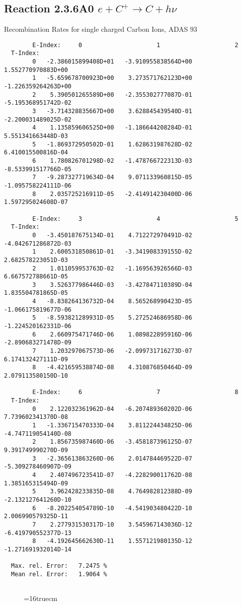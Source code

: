 \documentclass[12pt]{article}
\begin{document}
\subsection{
Reaction 2.3.6A0  $e + C^{+} \rightarrow C + h\nu$
}
 Recombination Rates for single
 charged Carbon Ions, ADAS 93

\begin{small}\begin{verbatim}
        E-Index:     0                     1                     2
  T-Index:
        0   -2.386015899408D+01   -3.910955838564D+00    1.552770970883D+00
        1   -5.659678700923D+00    3.273571762123D+00   -1.226359264263D+00
        2    5.390501265589D+00   -2.355302777087D-01   -5.195368951742D-02
        3   -3.714328835667D+00    3.628845439540D-01   -2.200031489025D-02
        4    1.135859606525D+00   -1.186644208284D-01    5.551341663448D-03
        5   -1.869372950502D-01    1.628631987628D-02    6.410015500816D-04
        6    1.780826701298D-02   -1.478766722313D-03   -8.533991517766D-05
        7   -9.287327719634D-04    9.071133960815D-05   -1.095758224111D-06
        8    2.035725216911D-05   -2.414914230400D-06    1.597295024608D-07

        E-Index:     3                     4                     5
  T-Index:
        0   -3.450187675134D-01    4.712272970491D-02   -4.042671286872D-03
        1    2.600531850861D-01   -3.341908339155D-02    2.682578223051D-03
        2    1.011059953763D-02   -1.169563926566D-03    6.667572788661D-05
        3    3.526377986446D-03   -3.427847110389D-04    1.835504781865D-05
        4   -8.838264136732D-04    8.565268990423D-05   -1.066175819677D-06
        5   -8.593821289931D-05    5.272524686958D-06   -1.224520162331D-06
        6    2.660975471746D-06    1.089822895916D-06   -2.890683271478D-09
        7    1.203297067573D-06   -2.099731716273D-07    6.174132427111D-09
        8   -4.421659538874D-08    4.310876850464D-09    2.079113580150D-10

        E-Index:     6                     7                     8
  T-Index:
        0    2.122032361962D-04   -6.207489360202D-06    7.739602341370D-08
        1   -1.336715470333D-04    3.811224434825D-06   -4.747119054140D-08
        2    1.856735987460D-06   -3.458187396125D-07    9.391749990270D-09
        3   -2.365613863260D-06    2.014784469522D-07   -5.309278460907D-09
        4    2.407496723541D-07   -4.228290011762D-08    1.385165315494D-09
        5    3.962428233835D-08    4.764982812388D-09   -2.132127641260D-10
        6   -8.202254054789D-10   -4.541903480422D-10    2.006990579325D-11
        7    2.277931530317D-10    3.545967143036D-12   -6.419790552377D-13
        8   -4.192645662630D-11    1.557121980135D-12   -1.271691932014D-14

  Max. rel. Error:   7.2475 %
  Mean rel. Error:   1.9064 %


\end{verbatim}\end{small}
\begin{figure} \label{2.3.6A0}
\epsfxsize=16truecm
\end{figure}
\newpage
\end{document}
